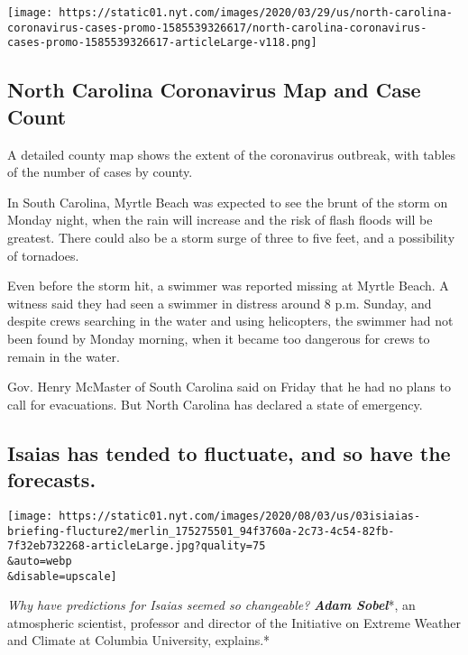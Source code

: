 \href{https://www.nytimes.com/interactive/2020/us/north-carolina-coronavirus-cases.html}{}

\texttt{[image: https://static01.nyt.com/images/2020/03/29/us/north-carolina-coronavirus-cases-promo-1585539326617/north-carolina-coronavirus-cases-promo-1585539326617-articleLarge-v118.png]}

\hypertarget{north-carolina-coronavirus-map-and-case-count}{%
\subsection{North Carolina Coronavirus Map and Case
Count}\label{north-carolina-coronavirus-map-and-case-count}}

A detailed county map shows the extent of the coronavirus outbreak, with
tables of the number of cases by county.

In South Carolina, Myrtle Beach was expected to see the brunt of the
storm on Monday night, when the rain will increase and the risk of flash
floods will be greatest. There could also be a storm surge of three to
five feet, and a possibility of tornadoes.

Even before the storm hit, a swimmer was reported missing at Myrtle
Beach. A witness said they had seen a swimmer in distress around 8 p.m.
Sunday, and despite crews searching in the water and using helicopters,
the swimmer had not been found by Monday morning, when it became too
dangerous for crews to remain in the water.

Gov. Henry McMaster of South Carolina said on Friday that he had no
plans to call for evacuations. But North Carolina has declared a state
of emergency.

\hypertarget{isaias-has-tended-to-fluctuate-and-so-have-the-forecasts}{%
\subsection{Isaias has tended to fluctuate, and so have the
forecasts.}\label{isaias-has-tended-to-fluctuate-and-so-have-the-forecasts}}

\texttt{[image: https://static01.nyt.com/images/2020/08/03/us/03isiaias-briefing-flucture2/merlin\_175275501\_94f3760a-2c73-4c54-82fb-7f32eb732268-articleLarge.jpg?quality=75\\\&auto=webp\\\&disable=upscale]}

\emph{Why have predictions for Isaias seemed so changeable?}
\emph{\textbf{Adam Sobel}}*, an atmospheric scientist, professor and
director of the Initiative on Extreme Weather and Climate at Columbia
University, explains.*

